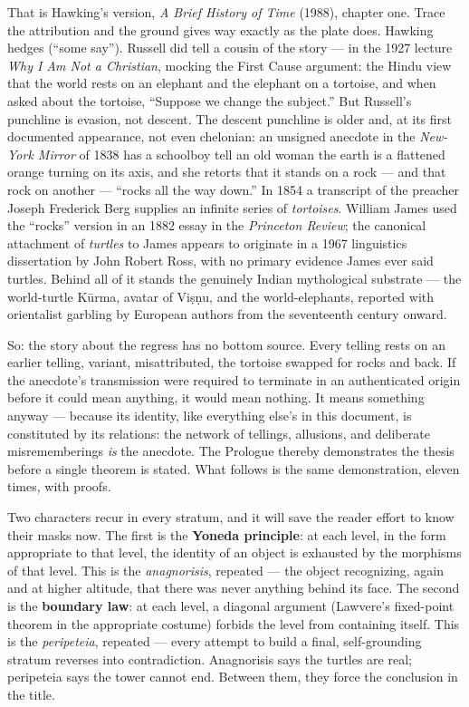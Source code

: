 \documentclass[11pt]{article}
\theoremstyle{plain}
\theoremstyle{definition}
\theoremstyle{remark}
\begin{document}
That is Hawking's version, \emph{A Brief History of Time} (1988), chapter one. Trace the attribution and the ground gives way exactly as the plate does. Hawking hedges (``some say''). Russell did tell a cousin of the story --- in the 1927 lecture \emph{Why I Am Not a Christian}, mocking the First Cause argument: the Hindu view that the world rests on an elephant and the elephant on a tortoise, and when asked about the tortoise, ``Suppose we change the subject.'' But Russell's punchline is evasion, not descent. The descent punchline is older and, at its first documented appearance, not even chelonian: an unsigned anecdote in the \emph{New-York Mirror} of 1838 has a schoolboy tell an old woman the earth is a flattened orange turning on its axis, and she retorts that it stands on a rock --- and that rock on another --- ``rocks all the way down.'' In 1854 a transcript of the preacher Joseph Frederick Berg supplies an infinite series of \emph{tortoises}. William James used the ``rocks'' version in an 1882 essay in the \emph{Princeton Review}; the canonical attachment of \emph{turtles} to James appears to originate in a 1967 linguistics dissertation by John Robert Ross, with no primary evidence James ever said turtles. Behind all of it stands the genuinely Indian mythological substrate --- the world-turtle K\=urma, avatar of Vi\d{s}\d{n}u, and the world-elephants, reported with orientalist garbling by European authors from the seventeenth century onward.

So: the story about the regress has no bottom source. Every telling rests on an earlier telling, variant, misattributed, the tortoise swapped for rocks and back. If the anecdote's transmission were required to terminate in an authenticated origin before it could mean anything, it would mean nothing. It means something anyway --- because its identity, like everything else's in this document, is constituted by its relations: the network of tellings, allusions, and deliberate misrememberings \emph{is} the anecdote. The Prologue thereby demonstrates the thesis before a single theorem is stated. What follows is the same demonstration, eleven times, with proofs.

Two characters recur in every stratum, and it will save the reader effort to know their masks now. The first is the \textbf{Yoneda principle}: at each level, in the form appropriate to that level, the identity of an object is exhausted by the morphisms of that level. This is the \emph{anagnorisis}, repeated --- the object recognizing, again and at higher altitude, that there was never anything behind its face. The second is the \textbf{boundary law}: at each level, a diagonal argument (Lawvere's fixed-point theorem in the appropriate costume) forbids the level from containing itself. This is the \emph{peripeteia}, repeated --- every attempt to build a final, self-grounding stratum reverses into contradiction. Anagnorisis says the turtles are real; peripeteia says the tower cannot end. Between them, they force the conclusion in the title.
\end{document}
